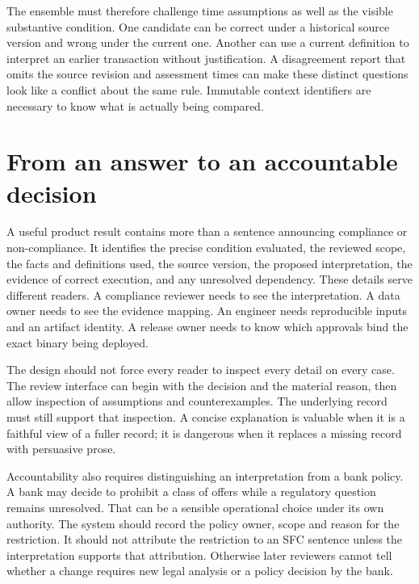 The ensemble must therefore challenge time assumptions as well as the visible
substantive condition. One candidate can be correct under a historical source
version and wrong under the current one. Another can use a current definition
to interpret an earlier transaction without justification. A disagreement report
that omits the source revision and assessment times can make these distinct
questions look like a conflict about the same rule. Immutable context identifiers
are necessary to know what is actually being compared.

\section{From an answer to an accountable decision}
\label{merge:M01:07}

\label{sec:problem-accountability}
A useful product result contains more than a sentence announcing compliance or
non-compliance. It identifies the precise condition evaluated, the reviewed scope,
the facts and definitions used, the source version, the proposed interpretation,
the evidence of correct execution, and any unresolved dependency. These details
serve different readers. A compliance reviewer needs to see the interpretation.
A data owner needs to see the evidence mapping. An engineer needs reproducible
inputs and an artifact identity. A release owner needs to know which approvals
bind the exact binary being deployed.

The design should not force every reader to inspect every detail on every case.
The review interface can begin with the decision and the material reason, then
allow inspection of assumptions and counterexamples. The underlying record must
still support that inspection. A concise explanation is valuable when it is a
faithful view of a fuller record; it is dangerous when it replaces a missing
record with persuasive prose.

Accountability also requires distinguishing an interpretation from a bank policy.
A bank may decide to prohibit a class of offers while a regulatory question
remains unresolved. That can be a sensible operational choice under its own
authority. The system should record the policy owner, scope and reason for the
restriction. It should not attribute the restriction to an SFC sentence unless
the interpretation supports that attribution. Otherwise later reviewers cannot
tell whether a change requires new legal analysis or a policy decision by the
bank.

